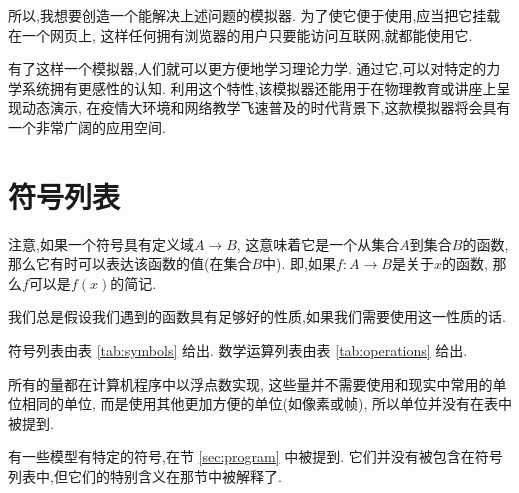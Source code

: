 \documentclass[12pt]{article}
\begin{document}
所以,我想要创造一个能解决上述问题的模拟器.
为了使它便于使用,应当把它挂载在一个网页上,
这样任何拥有浏览器的用户只要能访问互联网,就都能使用它.

有了这样一个模拟器,人们就可以更方便地学习理论力学.
通过它,可以对特定的力学系统拥有更感性的认知.
利用这个特性,该模拟器还能用于在物理教育或讲座上呈现动态演示,
在疫情大环境和网络教学飞速普及的时代背景下,这款模拟器将会具有一个非常广阔的应用空间.

\section{符号列表}

注意,如果一个符号具有定义域$A\rightarrow B$,
这意味着它是一个从集合$A$到集合$B$的函数,
那么它有时可以表达该函数的值(在集合$B$中).
即,如果$f:A\rightarrow B$是关于$x$的函数,
那么$f$可以是$f\left(x\right)$的简记.

我们总是假设我们遇到的函数具有足够好的性质,如果我们需要使用这一性质的话.

符号列表由表 \ref{tab:symbols} 给出.
数学运算列表由表 \ref{tab:operations} 给出.

所有的量都在计算机程序中以浮点数实现,
这些量并不需要使用和现实中常用的单位相同的单位,
而是使用其他更加方便的单位(如像素或帧),
所以单位并没有在表中被提到.

有一些模型有特定的符号,在节 \ref{sec:program} 中被提到.
它们并没有被包含在符号列表中,但它们的特别含义在那节中被解释了.
\end{document}
